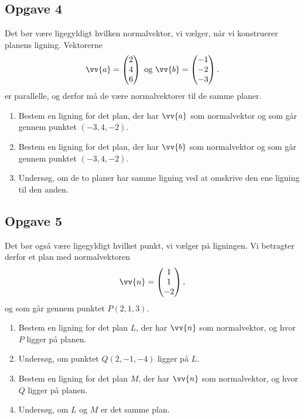 \subsection*{Opgave 4}
Det bør være ligegyldigt hvilken normalvektor, vi vælger, når vi konstruerer planens ligning. Vektorerne
\begin{align*}
	\vv{a} = 
	\begin{pmatrix}
		2 \\ 4 \\ 6
	\end{pmatrix} 
	\textnormal{ og }
	\vv{b} = 
	\begin{pmatrix}
		-1 \\ -2 \\ -3
	\end{pmatrix}.
\end{align*}
er parallelle, og derfor må de være normalvektorer til de samme planer.
\begin{enumerate}[label=\roman*)]
	\item Bestem en ligning for det plan, der har $\vv{a}$ som normalvektor og som går gennem punktet $(-3,4,-2)$.
	\item Bestem en ligning for det plan, der har $\vv{b}$ som normalvektor og som går gennem punktet $(-3,4,-2)$.
	\item Undersøg, om de to planer har samme ligning ved at omskrive den ene ligning til den anden. 
\end{enumerate}

\subsection*{Opgave 5}
Det bør også være ligegyldigt hvilket punkt, vi vælger på ligningen. Vi betragter derfor et plan med normalvektoren
\begin{align*}
	\vv{n} = 
	\begin{pmatrix}
		1 \\ 1 \\ -2
	\end{pmatrix},
\end{align*}
og som går gennem punktet $P(2,1,3)$.

\begin{enumerate}[label=\roman*)]
	\item Bestem en ligning for det plan $L$, der har $\vv{n}$ som normalvektor, og hvor $P$ ligger på planen. 
	\item Undersøg, om punktet  $Q(2,-1,-4)$ ligger på $L$.
	\item Bestem en ligning for det plan $M$, der har $\vv{n}$ som normalvektor, og hvor $Q$ ligger på planen.
	\item Undersøg, om $L$ og $M$ er det samme plan. 
\end{enumerate}
